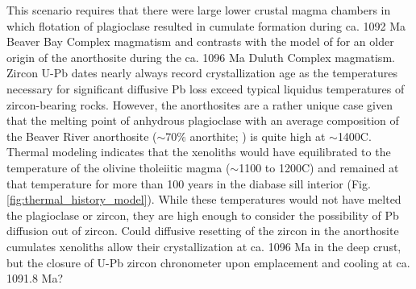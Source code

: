 This scenario requires that there were large lower crustal magma chambers in which flotation of plagioclase resulted in cumulate formation during ca. 1092 Ma Beaver Bay Complex magmatism and contrasts with the model of \cite{Miller1997a} for an older origin of the anorthosite during the ca. 1096 Ma Duluth Complex magmatism. Zircon U-Pb dates nearly always record crystallization age as the temperatures necessary for significant diffusive Pb loss exceed typical liquidus temperatures of zircon-bearing rocks. However, the anorthosites are a rather unique case given that the melting point of anhydrous plagioclase with an average composition of the Beaver River anorthosite ($\sim$70$\%$ anorthite; \citealp{Morrison1983a, Doyle2016a}) is quite high at $\sim$1400\textdegree C. Thermal modeling indicates that the xenoliths would have equilibrated to the temperature of the olivine tholeiitic magma ($\sim$1100 to 1200\textdegree C) and remained at that temperature for more than 100 years in the diabase sill interior (Fig. \ref{fig:thermal_history_model}). While these temperatures would not have melted the plagioclase or zircon, they are high enough to consider the possibility of Pb diffusion out of zircon. Could diffusive resetting of the zircon in the anorthosite cumulates xenoliths allow their crystallization at ca. 1096 Ma in the deep crust, but the closure of U-Pb zircon chronometer upon emplacement and cooling at ca. 1091.8 Ma?

